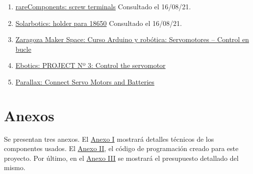 \documentclass[12pt]{article}
\begin{document}
\begin{enumerate}
				
				
				\item 
				\label{bib: rarecomponents screw}
				\href{https://rarecomponents.com/store/1219}{rareComponents: screw terminals} Consultado el 16/08/21.
				
				\item 
				\label{bib: solarbotics holder para 18650}
				\href{https://solarbotics.com/product/600058/}{Solarbotics: holder para 18650} Consultado el 16/08/21.
				
				\item
				\label{zaragoza maker arduino y servo curso}
				\href{https://zaragozamakerspace.com/index.php/lessons/curso-arduino-y-robotica-servomotores/}{Zaragoza Maker Space: Curso Arduino y robótica: Servomotores – Control en bucle}
			
				\item
				\label{ebotics servo parts}
				\href{https://ebotics.com/activity/project-no-3-control-the-servomotor/}{Ebotics: PROJECT Nº 3: Control the servomotor}
				
				\item
				\label{parallex servo}
				\href{https://learn.parallax.com/tutorials/robot/shield-bot/robotics-board-education-shield-arduino/chapter-2-shield-lights-servo-10}{Parallax: Connect Servo Motors and Batteries}
		
			\end{enumerate}

	\pagebreak
	
	\section*{Anexos}
	
	\noindent Se presentan tres anexos. El \hyperref[anexo I: ficha tecnica]{Anexo I} mostrará detalles técnicos de los componentes usados. El \hyperref[anexo II: codigo]{Anexo II}, el código de programación creado para este proyecto. Por último, en el \hyperref[anexo III: presupuesto]{Anexo III} se mostrará el presupuesto detallado del mismo. \\
	
	\pagebreak
	
\end{document}
